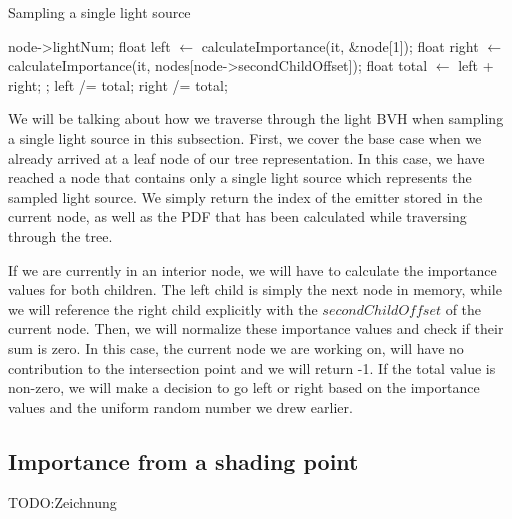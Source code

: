 \begin{algorithm}
	\caption{Sampling a single light source}
	\label{alg:sample1}
	\begin{algorithmic}[1] %
		\State \Return node->lightNum;
		\EndIf
		\State float left $\gets$ calculateImportance(it, \&node[1]);
		\State float right $\gets$ calculateImportance(it, nodes[node->secondChildOffset]);
		\State float total $\gets$ left + right;
		\State {};
		\EndIf
		\State left /= total;
		\State right /= total;
				\State <branch according to importance and sample1D>
		\EndProcedure
	\end{algorithmic}
\end{algorithm}

We will be talking about how we traverse through the light BVH when sampling a single light source in this subsection. First, we cover the base case when we already arrived at a leaf node of our tree representation. In this case, we have reached a node that contains only a single light source which represents the sampled light source. We simply return the index of the emitter stored in the current node, as well as the PDF that has been calculated while traversing through the tree.

If we are currently in an interior node, we will have to calculate the importance values for both children. The left child is simply the next node in memory, while we will reference the right child explicitly with the $secondChildOffset$ of the current node. Then, we will normalize these importance values and check if their sum is zero. In this case, the current node we are working on, will have no contribution to the intersection point and we will return -1. If the total value is non-zero, we will make a decision to go left or right based on the importance values and the uniform random number we drew earlier.

\subsection{Importance from a shading point}
\label{subs:imp}

TODO:Zeichnung

